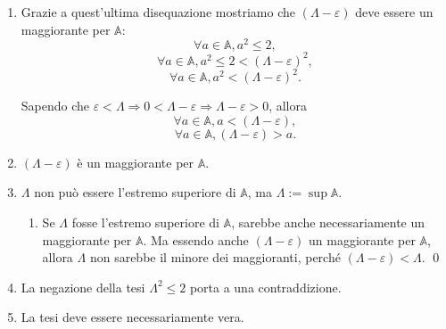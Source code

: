 \begin{enumerate}
\begin{demonstration}
\begin{enumerate}[label=(\roman*)]
\begin{enumerate}[label=\arabic*.]
                \[
                    \Lambda^2 - 2\Lambda\varepsilon  < \left(\Lambda - \varepsilon\right)^2,\]\[
                    \Lambda^2 - 2\Lambda\frac{\Lambda^2-2}{2\Lambda}  < \left(\Lambda - \varepsilon\right)^2,\]\[
                    \Lambda^2 - \left(\Lambda^2-2\right)  < \left(\Lambda - \varepsilon\right)^2,\]\[
                    \Lambda^2 - \Lambda^2 + 2  < \left(\Lambda - \varepsilon\right)^2,\]\[
                    2  < \left(\Lambda - \varepsilon\right)^2.
                \]

                \item Grazie a quest'ultima disequazione mostriamo che $(\Lambda-\varepsilon)$
                    deve essere un maggiorante per $\mathbb{A}$:
                \[
                    \forall a\in\mathbb{A}, a^2 \leq 2, \]\[
                    \forall a\in\mathbb{A}, a^2 \leq 2 < \left(\Lambda-\varepsilon\right)^2, \]\[
                    \forall a\in\mathbb{A}, a^2 < \left(\Lambda-\varepsilon\right)^2.
                \]

                Sapendo che $\varepsilon<\Lambda \Rightarrow  0 < \Lambda-\varepsilon
                \Rightarrow \Lambda-\varepsilon > 0$, allora
                \[
                    \forall a\in\mathbb{A}, a < \left(\Lambda-\varepsilon\right), \]\[
                    \forall a\in\mathbb{A}, \left(\Lambda-\varepsilon\right) > a. 
                \]

                \item $(\Lambda-\varepsilon)$ è un maggiorante per $\mathbb{A}$.
                \item $\Lambda$ non può essere l'estremo superiore di $\mathbb{A}$, ma $\Lambda:=\sup\mathbb{A}$.
                \begin{enumerate}[label=\arabic{enumiii}.\arabic*.]
                    \item Se $\Lambda$ fosse l'estremo superiore di $\mathbb{A}$, sarebbe anche necessariamente un
                    maggiorante per $\mathbb{A}$. Ma essendo anche $(\Lambda-\varepsilon)$ un maggiorante per $\mathbb{A}$,
                    allora $\Lambda$ non sarebbe il minore dei maggioranti, perché $(\Lambda-\varepsilon) < \Lambda$.
                    \qed
                \end{enumerate}
                \item La negazione della tesi $\Lambda^2 \leq 2$ porta a una contraddizione.
                \item La tesi deve essere necessariamente vera.



\end{enumerate}
\end{enumerate}
\end{demonstration}
\end{enumerate}
